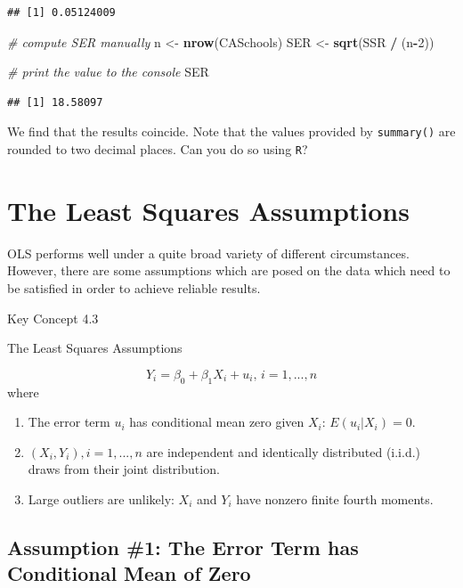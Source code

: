 \documentclass[]{book}
\newenvironment{Shaded}{\begin{snugshade}}{\end{snugshade}}
\newcommand{\KeywordTok}[1]{\textcolor[rgb]{0.13,0.29,0.53}{\textbf{#1}}}
\newcommand{\DecValTok}[1]{\textcolor[rgb]{0.00,0.00,0.81}{#1}}
\newcommand{\StringTok}[1]{\textcolor[rgb]{0.31,0.60,0.02}{#1}}
\newcommand{\CommentTok}[1]{\textcolor[rgb]{0.56,0.35,0.01}{\textit{#1}}}
\newcommand{\OperatorTok}[1]{\textcolor[rgb]{0.81,0.36,0.00}{\textbf{#1}}}
\newcommand{\NormalTok}[1]{#1}
\providecommand{\tightlist}{%
  \setlength{\itemsep}{0pt}\setlength{\parskip}{0pt}}
\theoremstyle{definition}
\theoremstyle{definition}
\theoremstyle{definition}
\theoremstyle{remark}
\begin{document}
\begin{verbatim}
## [1] 0.05124009
\end{verbatim}

\begin{Shaded}
\begin{Highlighting}[]
\CommentTok{# compute SER manually}
\NormalTok{n <-}\StringTok{ }\KeywordTok{nrow}\NormalTok{(CASchools)}
\NormalTok{SER <-}\StringTok{ }\KeywordTok{sqrt}\NormalTok{(SSR }\OperatorTok{/}\StringTok{ }\NormalTok{(n}\OperatorTok{-}\DecValTok{2}\NormalTok{))}

\CommentTok{# print the value to the console}
\NormalTok{SER}
\end{Highlighting}
\end{Shaded}

\begin{verbatim}
## [1] 18.58097
\end{verbatim}

We find that the results coincide. Note that the values provided by
\texttt{summary()} are rounded to two decimal places. Can you do so
using \texttt{R}?

\section{The Least Squares
Assumptions}\label{the-least-squares-assumptions}

OLS performs well under a quite broad variety of different
circumstances. However, there are some assumptions which are posed on
the data which need to be satisfied in order to achieve reliable
results.

Key Concept 4.3

The Least Squares Assumptions

\[Y_i = \beta_0 + \beta_1 X_i + u_i \text{, } i = 1, ...,n\] where

\begin{enumerate}
\def\labelenumi{\arabic{enumi}.}
\tightlist
\item
  The error term \(u_i\) has conditional mean zero given \(X_i\):
  \(E(u_i|X_i) = 0\).
\item
  \((X_i,Y_i), i = 1,...,n\) are independent and identically distributed
  (i.i.d.) draws from their joint distribution.
\item
  Large outliers are unlikely: \(X_i\) and \(Y_i\) have nonzero finite
  fourth moments.
\end{enumerate}

\subsection*{Assumption \#1: The Error Term has Conditional Mean of
Zero}\label{assumption-1-the-error-term-has-conditional-mean-of-zero}
\end{document}
